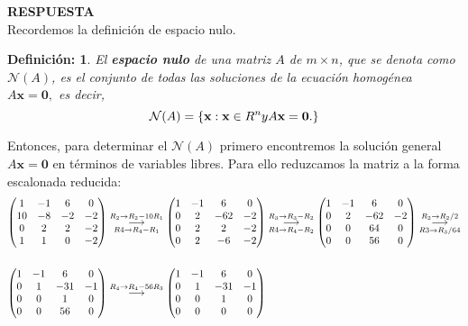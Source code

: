 \documentclass[11pt,letterpaper]{article}
\newcommand{\res}{\textbf{RESPUESTA}\\}
\newcommand{\grstep}[2][\relax]{%
   \ensuremath{\mathrel{
       {\mathop{\longrightarrow}\limits^{#2\mathstrut}_{
                                     \begin{subarray}{l} #1 \end{subarray}}}}}}
\newtheorem{thmd}{Definición:}
\begin{document}
\begin{enumerate}
\res 
Recordemos la definición de espacio nulo.
\begin{framed}
    \begin{thmd} \label{espacio_nulo}
    El \textbf{espacio nulo} de una matriz $A$ de $m\times n$, que se denota como $\mathcal{N}(A)$, es el conjunto de todas las soluciones de la ecuación homogénea $A\textbf{x}=\textbf{0},$ es decir,
    $$\mathcal{N}(A)=\{\textbf{x}: \textbf{x}\in R^n y A\bf \textbf{x}=\textbf{0}.\}$$
    \end{thmd}
\end{framed} 
Entonces, para determinar el $\mathcal{N}(A)$ primero encontremos la solución general $A\textbf{x}=\textbf{0}$ en términos de variables libres. Para ello reduzcamos la matriz a la forma escalonada reducida:
\begin{align*}
\begin{pmatrix}
 1 & -1 & 6 & 0\\
10 & -8 &-2 &-2\\
 0 &  2 & 2 &-2\\
 1 &  1 & 0 &-2
\end{pmatrix}&%
\grstep[R4 \rightarrow R_4-R_1]{R_2 \rightarrow R_2-10R_1}
%
\begin{pmatrix}
 1 & -1 &  6 & 0\\
 0 &  2 &-62 &-2\\
 0 &  2 &  2 &-2\\
 0 &  2 & -6 &-2
\end{pmatrix}%
\grstep[R4 \rightarrow R_4-R_2]{R_3 \rightarrow R_3-R_2}
%
\begin{pmatrix}
 1 & -1 &  6 & 0\\
 0 &  2 &-62 &-2\\
 0 &  0 & 64 & 0\\
 0 &  0 & 56 & 0
\end{pmatrix}%
\grstep[R3 \rightarrow R_3/64]{R_2 \rightarrow R_2/2} \\ \\
\begin{pmatrix}
 1 & -1 &  6 & 0\\
 0 &  1 &-31 &-1\\
 0 &  0 &  1 & 0\\
 0 &  0 & 56 & 0
\end{pmatrix}&%
\grstep[]{R_4 \rightarrow R_4-56R_3}
%
\begin{pmatrix}
 1 & -1 &  6 & 0\\
 0 &  1 &-31 &-1\\
 0 &  0 &  1 & 0\\
 0 &  0 &  0 & 0

\end{pmatrix}
\end{align*}
\end{enumerate}
\end{document}
